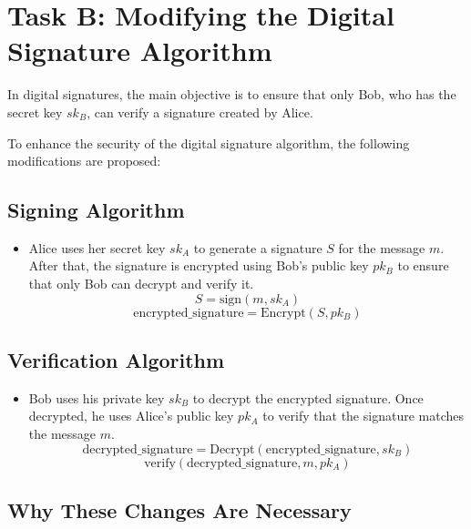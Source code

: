 \documentclass[12pt]{article}
\begin{document}
\section{Task B: Modifying the Digital Signature Algorithm}

In digital signatures, the main objective is to ensure that only Bob, who has the secret key \( sk_B \), can verify a signature created by Alice.

To enhance the security of the digital signature algorithm, the following modifications are proposed:

\subsection*{Signing Algorithm}

\begin{itemize}
    \item Alice uses her secret key \( sk_A \) to generate a signature \( S \) for the message \( m \). After that, the signature is encrypted using Bob's public key \( pk_B \) to ensure that only Bob can decrypt and verify it.
    \[
    S = \text{sign}(m, sk_A)
    \]
    \[
    \text{encrypted\_signature} = \text{Encrypt}(S, pk_B)
    \]
\end{itemize}

\subsection*{Verification Algorithm}

\begin{itemize}
    \item Bob uses his private key \( sk_B \) to decrypt the encrypted signature. Once decrypted, he uses Alice's public key \( pk_A \) to verify that the signature matches the message \( m \).
    \[
    \text{decrypted\_signature} = \text{Decrypt}(\text{encrypted\_signature}, sk_B)
    \]
    \[
    \text{verify}(\text{decrypted\_signature}, m, pk_A)
    \]
\end{itemize}

\subsection*{Why These Changes Are Necessary}
\end{document}
